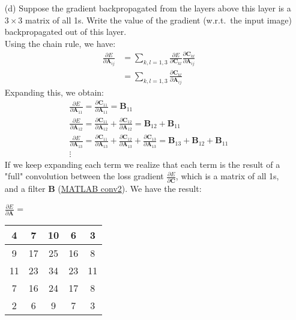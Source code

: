 \documentclass[11pt]{article}
\newcommand{\0}{\mat{0}}
\newcommand{\matr}[1]{\bm{#1}}     %
\begin{document}
\begin{itemize}
    \item[(d)] Suppose the gradient backpropagated from the layers above this layer is a $3\times 3$ matrix of all 1s. Write the value of the gradient (w.r.t.~the input image) backpropagated out of this layer.\\
    
    \smallskip
    Using the chain rule, we have:
   \begin{align*}
    	\frac{\partial E}{ \partial  \matr{A}_{ij}} &= \sum_{k,l=1,3} \frac{\partial E}{\partial \matr{C}_{kl}}   \frac{\partial \matr{C}_{kl}} {\partial  \matr{A}_{ij}} \\
	&= \sum_{k,l=1,3}  \frac{\partial \matr{C}_{kl}} {\partial  \matr{A}_{ij}}
    \end{align*}
    Expanding this, we obtain:
   \begin{gather*}
   	\frac{\partial E}{ \partial  \matr{A}_{11}} = \frac{\partial \matr{C}_{11}} {\partial  \matr{A}_{11}} =   \matr{B}_{11} \\
   	\frac{\partial E}{ \partial  \matr{A}_{12}} = \frac{\partial \matr{C}_{11}} {\partial  \matr{A}_{12}} + \frac{\partial \matr{C}_{12}} {\partial  \matr{A}_{12}} =    \matr{B}_{12} + \matr{B}_{11} \\
	\frac{\partial E}{ \partial  \matr{A}_{13}} = \frac{\partial \matr{C}_{11}} {\partial  \matr{A}_{13}} + \frac{\partial \matr{C}_{12}} {\partial  \matr{A}_{13}} + \frac{\partial \matr{C}_{13}} {\partial  \matr{A}_{13}}  =   \matr{B}_{13} + \matr{B}_{12} + \matr{B}_{11} \\
	\vdots
    \end{gather*}
    If we keep expanding each term we realize that each term is the result of a "full" convolution between the loss gradient $\frac{\partial E}{\partial \matr{C}}$, which is a matrix of all 1s, and a filter $\matr{B}$ (\href{https://www.mathworks.com/help/matlab/ref/conv2.html}{MATLAB conv2}).
    We have the result:
    
    	    \begin{table}[!ht]
		    \centering
    		 $\frac{\partial E}{\partial \matr{A}}$ = \begin{tabular}{|c|c|c|c|c|}  
    			\hline
    			 4  & 7  & 10 &  6 & 3 \\ \hline 
		         9  & 17 & 25 & 16 & 8 \\ \hline
		        11  & 23 & 34 & 23 & 11 \\ \hline 
		         7  & 16 & 24 & 17 & 8 \\ \hline
		         2  & 6  &  9 &  7 & 3 \\ \hline
    		\end{tabular}\hspace{1cm}
        	 \end{table}

\end{itemize}
\end{document}

